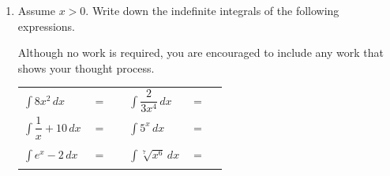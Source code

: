 \documentclass[11pt]{article}
\begin{document}
\begin{enumerate}
\begin{enumerate}
\begin{enumerate}
    \vfill
    \vfill

    \item Suppose that $r(t)$ is positive and decreasing from 4 hours to 6 hours after the substance is introduced into the blood. Based on this, is $\displaystyle\int_{4}^6r(t)\, dt$ positive, negative, or zero? No justification required.

    \vfill

    \end{enumerate}

    \item A stamp collector has 500 stamps in his collection on January 1, 2022, and is collecting more stamps at a rate of $r(t)$ stamps per week, where t is time in weeks since January 1, 2022. Assuming a year has 52 weeks, write down an expression representing the number of stamps this collector has at the end of 2022.

    \vfill
    \vfill
\end{enumerate}


\newpage


\item Assume $x>0$. Write down the indefinite integrals of the following expressions. 

Although no work is required, you are encouraged to include any work that shows your thought process. 


\begin{center}
        \begin{tabular}{l c r l c r}
            $\displaystyle\int 8x^2\,dx$ & $=$ & \rule[-8pt]{1.5in}{0.4pt} &
            $\displaystyle\int \dfrac{2}{3x^4} \,dx$ & $=$ & \rule[-8pt]{1.5in}{0.4pt}\\[1in]
            $\displaystyle\int \dfrac{1}{x}+10\,dx$ & $=$ & \rule[-8pt]{1.5in}{0.4pt}&
            $\displaystyle\int 5^x\,dx$ & $=$ & \rule[-8pt]{1.5in}{0.4pt}\\[1in]
            $\displaystyle\int e^x-2 \,dx$ & $=$ & \rule[-8pt]{1.5in}{0.4pt} & 
            $\displaystyle\int \sqrt[7]{x^6} \,dx$ & $=$ & \rule[-8pt]{1.5in}{0.4pt}\\[0.3in]
        \end{tabular}
\end{center}


\end{enumerate}
\end{document}
